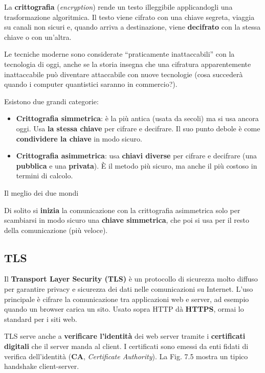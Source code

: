 La \textbf{crittografia} (\emph{encryption}) rende un testo illeggibile
applicandogli una trasformazione algoritmica. Il testo viene cifrato con
una chiave segreta, viaggia su canali non sicuri e, quando arriva a
destinazione, viene \textbf{decifrato} con la stessa chiave o con
un'altra.

Le tecniche moderne sono considerate ``praticamente inattaccabili'' con
la tecnologia di oggi, anche se la storia insegna che una cifratura
apparentemente inattaccabile può diventare attaccabile con nuove
tecnologie (cosa succederà quando i computer quantistici saranno in
commercio?).

Esistono due grandi categorie:

\begin{itemize}
\tightlist
\item
  \textbf{Crittografia simmetrica}: è la più antica (usata da secoli) ma
  si usa ancora oggi. Usa \textbf{la stessa chiave} per cifrare e
  decifrare. Il suo punto debole è come \textbf{condividere la chiave}
  in modo sicuro.
\item
  \textbf{Crittografia asimmetrica}: usa \textbf{chiavi diverse} per
  cifrare e decifrare (una \textbf{pubblica} e una \textbf{privata}). È
  il metodo più sicuro, ma anche il più costoso in termini di calcolo.
\end{itemize}

\begin{boxtip}{Il meglio dei due mondi}

Di solito si \textbf{inizia} la comunicazione con la crittografia
asimmetrica solo per scambiarsi in modo sicuro una \textbf{chiave
simmetrica}, che poi si usa per il resto della comunicazione (più
veloce).

\end{boxtip}

\subsection{TLS}\label{tls}

Il \textbf{Transport Layer Security (TLS)} è un protocollo di sicurezza
molto diffuso per garantire privacy e sicurezza dei dati nelle
comunicazioni su Internet. L'uso principale è cifrare la comunicazione
tra applicazioni web e server, ad esempio quando un browser carica un
sito. Usato sopra HTTP dà \textbf{HTTPS}, ormai lo standard per i siti
web.

TLS serve anche a \textbf{verificare l'identità} dei web server tramite
i \textbf{certificati digitali} che il server manda al client. I
certificati sono emessi da enti fidati di verifica dell'identità
(\textbf{CA}, \emph{Certificate Authority}). La Fig. 7.5 mostra un
tipico handshake client-server.

